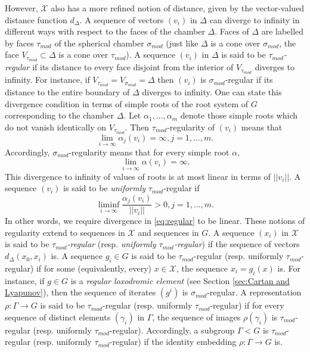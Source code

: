 \documentclass[12pt]{amsbook}%
\theoremstyle{definition}
\theoremstyle{remark}
\numberwithin{section}{chapter}
\numberwithin{subsection}{section}
\numberwithin{figure}{chapter}
\def\taumod{\tau_{mod}}
\def\simod{\sigma_{mod}}
\def\cX{{\mathscr{X}}}
\def\Ga{\Gamma}
\def\ga{\gamma}
\def\al{\alpha}
\begin{document}
{{However, $\cX$ also has a more refined notion of distance, given by the vector-valued distance function $d_\Delta$. A sequence of vectors $(v_i)$ in $\Delta$ can diverge to infinity in different ways with respect to the faces of the chamber $\Delta$. Faces of $\Delta$ are labelled by faces $\taumod$ 
of the spherical chamber $\simod$ (just like $\Delta$ is a cone over $\simod$, the face $V_{\taumod}\subset \Delta$ is a cone over $\taumod$).  
A sequence $(v_i)$ in $\Delta$  is said to be {\em $\taumod$-regular} if 
its distance to every face disjoint from the interior of $V_{\taumod}$ diverges to infinity. For instance, if $V_{\taumod}=V_{\simod}=\Delta$ then $(v_i)$ is $\simod$-regular if its distance to the entire boundary  
of $\Delta$ diverges to infinity. One can state this divergence condition in terms of simple roots of the root system of $G$ corresponding to the chamber $\Delta$. 
Let $\alpha_1,...,\alpha_m$ denote those simple roots which do not vanish identically on $V_{\taumod}$. Then $\taumod$-regularity of  $(v_i)$ means that 
$$
\lim_{i\to\infty} \alpha_j(v_i)=\infty, j=1,...,m. 
$$
Accordingly, $\simod$-regularity means that for every simple root $\al$, 
\begin{equation}\label{eq:regular}
\lim_{i\to\infty} \alpha(v_i)=\infty. 
\end{equation}
This divergence to infinity of values of roots is at most linear in terms of $||v_i||$. A sequence $(v_i)$ is said to be {\em uniformly} $\taumod$-regular if 
$$
\liminf_{i\to\infty} \frac{\alpha_j(v_i)}{||v_i||}>0, j=1,...,m. 
$$
In other words, we require divergence in \eqref{eq:regular} to be linear. 
These notions of regularity extend to sequences in $\cX$ and sequences in $G$. A sequence $(x_i)$ in $\cX$ is said to be {\em $\taumod$-regular} (resp. {\em uniformly 
$\taumod$-regular}) if the sequence of vectors $d_\Delta(x_0, x_i)$ is. A sequence $g_i\in G$ is said to be 
$\taumod$-regular (resp. uniformly $\taumod$-regular) if for some (equivalently, every) $x\in \cX$, the sequence $x_i=g_i(x)$ is. For instance, if $g\in G$ is 
a {\em regular loxodromic element} (see Section \ref{sec:Cartan and Lyapunov}), then the sequence of iterates $(g^i)$ is $\simod$-regular.   
A representation 
$\rho: \Ga\to G$ is said to be $\taumod$-regular (resp. uniformly $\taumod$-regular) if for every sequence of distinct elements $(\ga_i)$ in $\Ga$, the sequence 
of images $\rho(\ga_i)$ is $\taumod$-regular (resp. uniformly $\taumod$-regular). Accordingly, a subgroup $\Ga< G$ is 
$\taumod$-regular (resp. uniformly $\taumod$-regular) if the identity embedding $\rho: \Ga\to G$ is.  

}}
\end{document}
